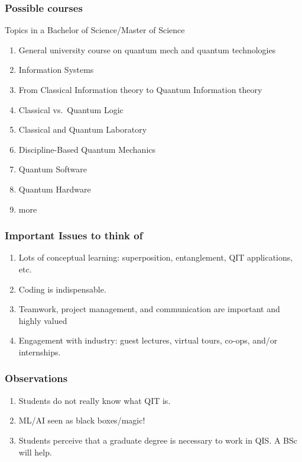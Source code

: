 \documentclass{beamer}
\begin{document}
\begin{frame}
\frametitle{Possible courses}

\begin{block}{Topics  in a Bachelor of Science/Master of Science }
\begin{enumerate}
\item General university course on quantum mech and quantum technologies

\item Information Systems 

\item From Classical Information theory to Quantum Information theory

\item Classical vs.~Quantum Logic

\item Classical and Quantum Laboratory 

\item Discipline-Based Quantum Mechanics 

\item Quantum Software

\item Quantum Hardware

\item more
\end{enumerate}

\noindent
\end{block}
\end{frame}

\begin{frame}
\frametitle{Important Issues to think of}

\begin{enumerate}
\item Lots of conceptual learning: superposition, entanglement, QIT applications, etc.

\item Coding is indispensable. 

\item Teamwork, project management, and communication are important and highly valued

\item Engagement with industry: guest lectures, virtual tours, co-ops, and/or internships.
\end{enumerate}

\noindent
\end{frame}

\begin{frame}
\frametitle{Observations}

\begin{enumerate}
\item Students do not really know what QIT is.

\item ML/AI seen as black boxes/magic!

\item Students perceive that a graduate degree is necessary to work in QIS. A BSc will help.
\end{enumerate}

\noindent
\end{frame}
\end{document}
